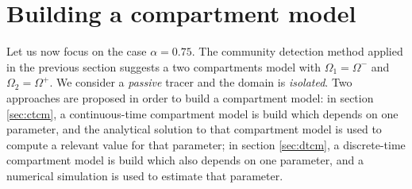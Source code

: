 \section{Building a compartment model}
Let us now focus on the case $\alpha = 0.75$. The community detection method applied in the previous section suggests a two compartments model with $\Omega_1 = \Omega^-$ and $\Omega_2 = \Omega^+$. We consider a \textit{passive} tracer and the domain is \textit{isolated}. Two approaches are proposed in order to build a compartment model: in section \ref{sec:ctcm}, a continuous-time compartment model is build which depends on one parameter, and the analytical solution to that compartment model is used to compute a relevant value for that parameter; in section \ref{sec:dtcm}, a discrete-time compartment model is build which also depends on one parameter, and a numerical simulation is used to estimate that parameter.  

